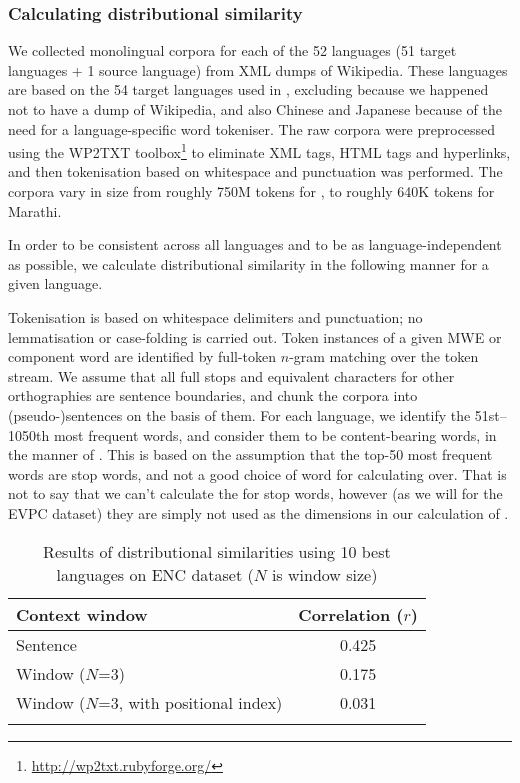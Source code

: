 \documentclass[output=paper,modfonts,nonflat]{langsci/langscibook}
\begin{document}
\subsubsection{Calculating distributional similarity\label{sec:ds:calculating}}

We collected monolingual corpora for each of the 52 languages (51 target
languages + 1 source language) from XML dumps of Wikipedia. These
languages are based on the 54 target languages used in
, excluding  because we happened not to
have a dump of  Wikipedia, and also Chinese and Japanese
because of the need for a language-specific word tokeniser. The raw
corpora were preprocessed using the WP2TXT
toolbox\footnote{\smaller\url{http://wp2txt.rubyforge.org/}} to
eliminate XML tags, HTML tags and hyperlinks, and then tokenisation
based on whitespace and punctuation was performed. The corpora vary in
size from roughly 750M tokens for , to roughly 640K tokens for
Marathi.

In order to be consistent across all languages and to be as
language-indepen\-dent as possible, we calculate distributional
similarity in the following manner for a given language.

Tokenisation is based on whitespace delimiters and punctuation; no
lemmatisation or case-folding is carried out. Token instances of a
given MWE or component word are identified by full-token $n$-gram
matching over the token stream. We assume that all full stops and
equivalent characters for other orthographies are sentence boundaries,
and chunk the corpora into (pseudo-)sentences on the basis of
them. For each language, we identify the 51st--1050th most frequent
words, and consider them to be content-bearing words, in the manner of
\citet{Schutze:1997}. This is based on the assumption that the top-50
most frequent words are stop words, and not a good choice of word for
calculating  over. That is not to say that we
can't calculate the  for stop words, however
(as we will for the EVPC dataset) they are simply not used as the
dimensions in our calculation of .

\begin{table}[t]

\begin{tabular}{l c} 
\lsptoprule
Context window &Correlation ($r$) \\\midrule
Sentence & 0.425 \\
Window ($N$=3) & 0.175 \\
Window ($N$=3, with positional index) & 0.031 \\
\lspbottomrule
\end{tabular}
\caption{\label{tab:ds:premResult} Results of distributional similarities using 10 best languages on ENC dataset ($N$ is window size)}

\end{table}
\end{document}
